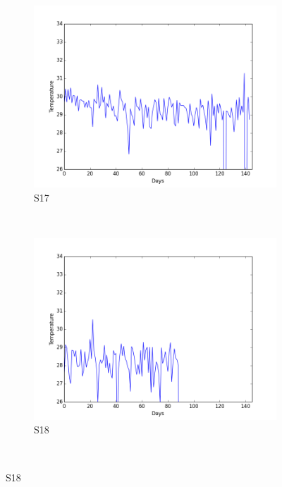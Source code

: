 \documentclass[12pt]{article} %
\begin{document}
\begin{figure}[H]
    \begin{subfigure}[b]{0.2\textwidth}
        \includegraphics[width=\textwidth]{img/graphs/17-airtemp-1}
        \caption{S17}
        \label{fig:s17AT}
    \end{subfigure}
    ~ %
    \begin{subfigure}[b]{0.2\textwidth}
        \includegraphics[width=\textwidth]{img/graphs/18-airtemp-1}
        \caption{S18}
        \label{fig:s18AT}
    \end{subfigure}
    ~ %

\end{figure}
\end{document}
